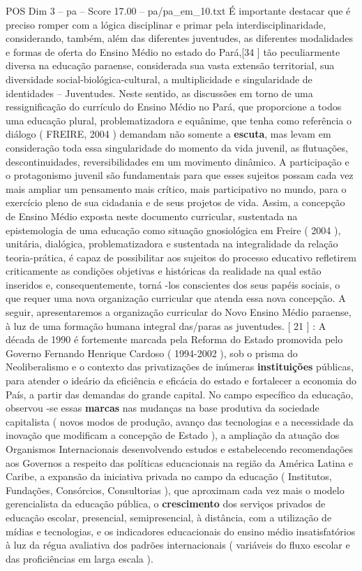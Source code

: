 \begin{textsample}{POS Dim 3 – pa – Score 17.00 – pa/pa\_em\_10.txt}
É importante destacar que é preciso romper com a lógica disciplinar e primar pela interdisciplinaridade, considerando, também, além das diferentes juventudes, as diferentes modalidades e formas de oferta do Ensino Médio no estado do Pará,[34 ] tão peculiarmente diversa na educação paraense, considerada sua vasta extensão territorial, sua diversidade social-biológica-cultural, a multiplicidade e singularidade de identidades – Juventudes.
Neste sentido, as discussões em torno de uma ressignificação do currículo do Ensino Médio no Pará, que proporcione a todos uma educação plural, problematizadora e equânime, que tenha como referência o diálogo ( FREIRE, 2004 ) demandam não somente a \textbf{escuta}, mas levam em consideração toda essa singularidade do momento da vida juvenil, as flutuações, descontinuidades, reversibilidades em um movimento dinâmico.
A participação e o protagonismo juvenil são fundamentais para que esses sujeitos possam cada vez mais ampliar um pensamento mais crítico, mais participativo no mundo, para o exercício pleno de sua cidadania e de seus projetos de vida.
Assim, a concepção de Ensino Médio exposta neste documento curricular, sustentada na epistemologia de uma educação como situação gnosiológica em Freire ( 2004 ), unitária, dialógica, problematizadora e sustentada na integralidade da relação teoria-prática, é capaz de possibilitar aos sujeitos do processo educativo refletirem criticamente as condições objetivas e históricas da realidade na qual estão inseridos e, consequentemente, torná -los conscientes dos seus papéis sociais, o que requer uma nova organização curricular que atenda essa nova concepção.
A seguir, apresentaremos a organização curricular do Novo Ensino Médio paraense, à luz de uma formação humana integral das/paras as juventudes. [ 21 ] : A década de 1990 é fortemente marcada pela Reforma do Estado promovida pelo Governo Fernando Henrique Cardoso ( 1994-2002 ), sob o prisma do Neoliberalismo e o contexto das privatizações de inúmeras \textbf{instituições} públicas, para atender o ideário da eficiência e eficácia do estado e fortalecer a economia do País, a partir das demandas do grande capital.
No campo específico da educação, observou -se essas \textbf{marcas} nas mudanças na base produtiva da sociedade capitalista ( novos modos de produção, avanço das tecnologias e a necessidade da inovação que modificam a concepção de Estado ), a ampliação da atuação dos Organismos Internacionais desenvolvendo estudos e estabelecendo recomendações aos Governos a respeito das políticas educacionais na região da América Latina e Caribe, a expansão da iniciativa privada no campo da educação ( Institutos, Fundações, Consórcios, Consultorias ), que aproximam cada vez mais o modelo gerencialista da educação pública, o \textbf{crescimento} dos serviços privados de educação escolar, presencial, semipresencial, à distância, com a utilização de mídias e tecnologias, e os indicadores educacionais do ensino médio insatisfatórios à luz da régua avaliativa dos padrões internacionais ( variáveis do fluxo escolar e das proficiências em larga escala ).

\end{textsample}
